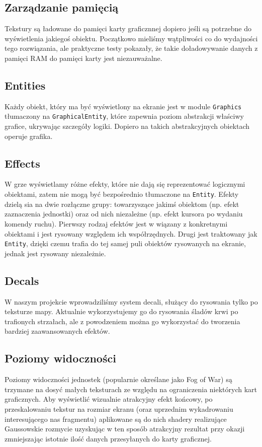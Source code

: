 \documentclass[licencjacka]{pracamgr}
\begin{document}
    \subsection{Zarządzanie pamięcią}
      Tekstury są ładowane do pamięci karty graficznnej dopiero jeśli są potrzebne do wyświetlenia jakiegoś
      obiektu. Początkowo mieliśmy wątpliwości co do wydajności tego rozwiązania, ale praktyczne testy pokazały, że
      takie doładowywanie danych z pamięci RAM do pamięci karty jest niezauważalne.

    \subsection{Entities}
      Każdy obiekt, który ma być wyświetlony na ekranie jest w module \texttt{Graphics} tłumaczony na \texttt{GraphicalEntity}, które
      zapewnia poziom abstrakcji właściwy grafice, ukrywając szczegóły logiki. Dopiero na takich abstrakcyjnych obiektach operuje grafika.

    \subsection{Effects}
      W grze wyświetlamy różne efekty, które nie dają się reprezentować logicznymi obiektami, zatem nie mogą być bezpośrednio tłumaczone
      na \texttt{Entity}. Efekty dzielą sia na dwie rozłączne grupy: towarzyszące jakimś obiektom (np. efekt zaznaczenia jednostki) oraz 
      od nich niezależne (np. efekt kursora po wydaniu komendy ruchu). Pierwszy rodzaj efektów jest w wiązany z konkretnymi obiektami i jest
      rysowany względem ich współrzędnych. Drugi jest traktowany jak \texttt{Entity}, dzięki czemu trafia do tej samej puli obiektów rysowanych
      na ekranie, jednak jest rysowany niezależnie.

    \subsection{Decals}
      W naszym projekcie wprowadziliśmy system decali, służący do rysowania tylko po teksturze mapy. Aktualnie wykorzystujemy go do
      rysowania śladów krwi po trafionych strzałach, ale z powodzeniem można go wykorzystać do tworzenia bardziej zaawansowanych efektów.

    \subsection{Poziomy widoczności}
      Poziomy widoczności jednostek (popularnie określane jako Fog of War) są trzymane na dosyć małych teksturach ze względu na ograniczenia
      niektórych kart graficznych. Aby wyświetlić wizualnie atrakcyjny efekt końcowy, po przeskalowaniu tekstur na rozmiar ekranu
      (oraz uprzednim wykadrowaniu interesującego nas fragmentu) aplikowane są do nich shadery realizujące Gaussowskie rozmycie\cite{GB}
      uzyskując w ten sposób atrakcyjny rezultat przy okazji zmniejszając istotnie ilość danych przesyłanych do karty graficznej.
\end{document}
